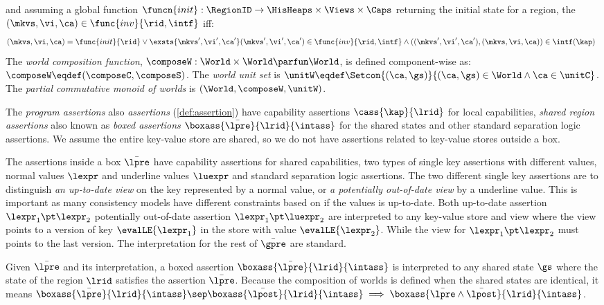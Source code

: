 \begin{definition}[Worlds]
\[\] 
and assuming a global function \( \funcn{init} : \RegionID \to \HisHeaps \times \Views \times \Caps \) returning the initial state for a region,
the \( ( \mkvs, \vi, \ca ) \in \func{inv}{\rid, \intf} \) iff:
\[
\begin{array}[t]{@{}l}
    ( \mkvs, \vi, \ca ) = \func{init}{\rid} 
    \lor \exsts{\mkvs', \vi', \ca'}
    ( \mkvs' , \vi', \ca' ) \in \func{inv}{\rid, \intf} \land (( \mkvs' , \vi', \ca' ), ( \mkvs, \vi, \ca )) \in \intf(\kap) 
\end{array}
\]
% 
The \emph{world composition function}, $\composeW: \World \times \World \parfun \World$, is defined component-wise as: $\composeW \eqdef (\composeC, \composeS)$.
The \emph{world unit set} is $\unitW \eqdef \Setcon{(\ca, \gs)}{(\ca, \gs) \in \World \land \ca \in \unitC}$.
The \emph{partial commutative monoid of worlds} is $(\World, \composeW, \unitW)$.
\end{definition}

The \emph{program assertions} also \emph{assertions} (\cref{def:assertion}) have capability assertions \( \cass{\kap}{\lrid} \) for local capabilities, \emph{shared region assertions} also known as \emph{boxed assertions} \( \boxass{\bar{\lpre}}{\lrid}{\intass} \) for the shared states and other standard separation logic assertions.
We assume the entire key-value store are shared, so we do not have assertions related to key-value stores outside a box.

The assertions inside a box \( \bar{\lpre} \) have capability assertions for shared capabilities, two types of single key assertions with different values, normal values \( \lexpr \) and underline values \( \luexpr \) and standard separation logic assertions.
The two different single key assertions are to distinguish \emph{an up-to-date view} on the key represented by a normal value, or \emph{a potentially out-of-date view} by a underline value.
This is important as many consistency models have different constraints based on if the values is up-to-date.
Both up-to-date assertion \( \lexpr_1 \pt \lexpr_2 \)  potentially out-of-date assertion \( \lexpr_1 \pt \luexpr_2 \) are interpreted to any key-value store and view where the view points to a version of key \( \evalLE{\lexpr_1 }\) in the store with value \( \evalLE{\lexpr_2}\).
While the view  for \( \lexpr_1 \pt \lexpr_2 \) must points to the last version.
The interpretation for the rest of \( \bar{\gpre} \) are standard.

Given \( \bar{\lpre} \) and its interpretation, a boxed assertion \( \boxass{\bar{\lpre}}{\lrid}{\intass} \) is interpreted to any shared state \( \gs \) where the state of the region \( \lrid \) satisfies the assertion \( \bar{\lpre} \).
Because the composition of worlds is defined when the shared states are identical, it means \( \boxass{\bar{\lpre}}{\lrid}{\intass} \sep \boxass{\bar{\lpost}}{\lrid}{\intass} \implies \boxass{\bar{\lpre} \land \bar{\lpost} }{\lrid}{\intass} \).

